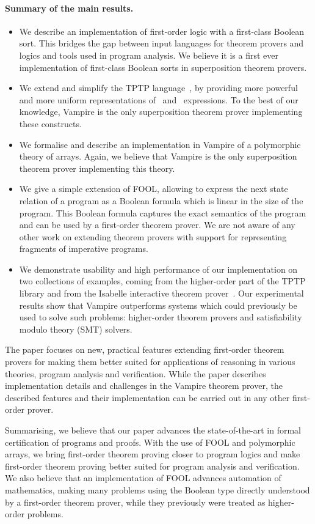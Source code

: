 \noindent\paragraph{Summary of the main results.}
\begin{itemize}
\item We describe an implementation of first-order logic with a first-class Boolean sort. This bridges the gap between input languages for theorem provers and logics and tools used in program analysis. We believe it is a first ever implementation of first-class Boolean sorts in superposition theorem provers.

\item We extend and simplify the TPTP language~\cite{TPTP}, by providing more powerful and more uniform representations of \ITE\ and \LETIN\ expressions. To the best of our knowledge, Vampire is the only superposition theorem prover implementing these constructs.

\item We formalise and describe an implementation in Vampire of a polymorphic theory of arrays. Again, we believe that Vampire is the only superposition theorem prover implementing this theory.

\item We give a simple extension of FOOL, allowing to express the next state relation of a program as a Boolean formula which is linear in the size of the program. This  Boolean formula captures the exact semantics of the program and can be used by a first-order theorem prover. We are not aware of any other work on extending theorem provers with support for representing fragments of imperative programs.

\item We demonstrate usability and high performance of our implementation on two collections of examples, coming from the higher-order part of the TPTP library and from the Isabelle interactive theorem prover~\cite{Isabelle}. Our experimental results show that Vampire outperforms systems which could previously be used to solve such problems:
higher-order theorem provers and satisfiability modulo theory (SMT) solvers.
\end{itemize}

The paper focuses on new, practical features extending first-order theorem provers for making them better suited for applications of reasoning in various theories, program analysis and verification. While the paper describes implementation details and challenges in the Vampire theorem prover, the described features and their implementation can be carried out in any other first-order prover.

Summarising, we believe that our paper advances the state-of-the-art in formal certification of programs and proofs. With the use of FOOL and polymorphic arrays, we bring first-order theorem proving closer to program logics and make first-order theorem proving better suited for program analysis and verification. We also believe that an implementation of FOOL advances automation of mathematics, making many problems using the Boolean type directly understood by a first-order theorem prover, while they previously were treated as higher-order problems.
